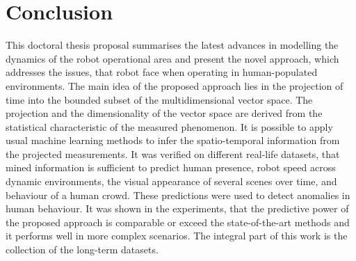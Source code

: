 \section{Conclusion\label{sec:conclusion}}

This doctoral thesis proposal summarises the latest advances in modelling the dynamics of the robot operational area and present the novel approach, which addresses the issues, that robot face when operating in human-populated environments.
The main idea of the proposed approach lies in the projection of time into the bounded subset of the multidimensional vector space.
The projection and the dimensionality of the vector space are derived from the statistical characteristic of the measured phenomenon.
It is possible to apply usual machine learning methods to infer the spatio-temporal information from the projected measurements.
It was verified on different real-life datasets, that mined information is sufficient to predict human presence, robot speed across dynamic environments, the visual appearance of several scenes over time, and behaviour of a human crowd.
These predictions were used to detect anomalies in human behaviour.
It was shown in the experiments, that the predictive power of the proposed approach is comparable or exceed the state-of-the-art methods and it performs well in more complex scenarios.
The integral part of this work is the collection of the long-term datasets.